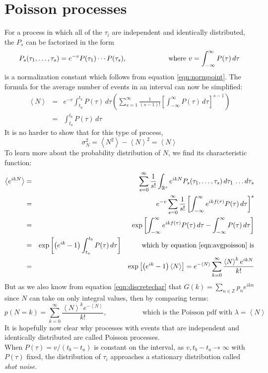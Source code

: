\documentclass{article}
\begin{document}
\section*{Poisson processes}
For a process in which all of the $\tau_i$ are independent and identically distributed, the $P_s$ can be factorized in the form
\[ P_s(\tau_1,\ldots, \tau_s) = e^{-v} P(\tau_1) \cdots P(\tau_s), \hspace{2 cm} \textrm{ where } v = \int_{-\infty}^{\infty} P(\tau) \, d\tau \]
is a normalization constant which follows from equation \ref{eqn:normpoint}. The formula for the average number of events in an interval can now be simplified:
\begin{eqnarray}
\left< N \right> & = & e^{-v} \int_{t_a}^{t_b} P(\tau) \, d \tau \left( \sum_{s=1}^{\infty} \frac{1}{(s-1)!}   \left[  \int_{-\infty}^{\infty} P(\tau) \, d\tau \right]^{s-1} \right) \nonumber \\
& = &  \int_{t_a}^{t_b} P(\tau) \, d \tau \label{eqn:avgpoisson}
\end{eqnarray}
It is no harder to show that for this type of process,
\[ \sigma_N^2 = \left< N^2 \right> - \left< N \right>^2 = \left< N \right> \]
To learn more about the probability distribution of $N$, we find its characteristic function:
\begin{eqnarray*}
\left< e^{ikN} \right> & = & \sum_{s=0}^{\infty} \frac{1}{s!} \int_{\mathbb{R}^{s}} e^{ikN} P_s(\tau_1,\ldots,\tau_s) \, d\tau_1 \, \ldots d\tau_s  \\
& = & e^{-v} \sum_{s=0}^{\infty} \frac{1}{s!} \left[ \int_{-\infty}^{\infty} e^{ikf(\tau)} P(\tau) \, d\tau \right]^s\\
& = & \exp \left[\int_{-\infty}^{\infty} e^{ikf(\tau)} P(\tau) \, d\tau  - \int_{-\infty}^{\infty} P(\tau) \, d\tau \right]\\
& = & \exp \left[  \left( e^{ik} - 1 \right) \int_{t_a}^{t_b} P(\tau) \, d\tau \right] \hspace{ 1 cm} \textrm{which by equation \ref{eqn:avgpoisson} is}\\
& = & \exp \left[  \left( e^{ik} - 1 \right)  \left< N \right> \right] = e^{-\left< N \right>} \sum_{k=0}^{\infty} \frac{\left< N \right>^k e^{ikN}}{k!}\\
\end{eqnarray*}
But as we also know from equation \ref{eqn:discretechar} that $G(k) = \sum_{n \in \mathbb{Z}} p_n e^{ikn}$ since $N$ can take on only integral values, then by comparing terms:
\[ p(N=k) =   \sum_{k=0}^{\infty} \frac{\left< N \right>^k e^{-\left< N \right>}}{k!}, \hspace{2cm} \textrm{ which is the Poisson pdf with } \lambda = \left< N \right>\]
It is hopefully now clear why processes with events that are independent and identically distributed are called Poisson processes.\\

When $P(\tau)=v/(t_b-t_a)$ is constant on the interval, as $v,t_b-t_a \to \infty$ with $P(\tau)$ fixed, the distribution of $\tau_i$ approaches a stationary distribution called \textit{shot noise}.
\end{document}
